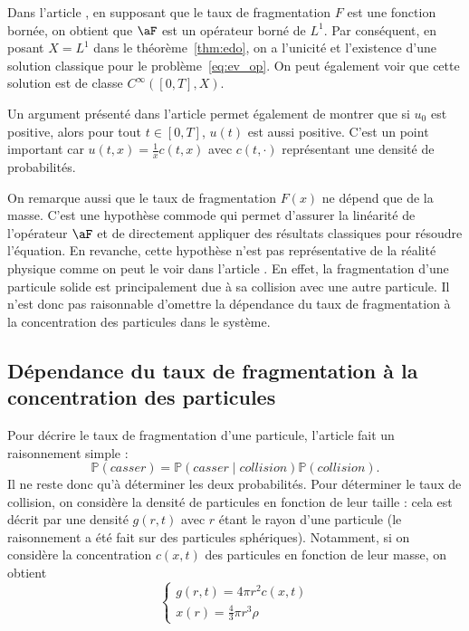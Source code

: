 \begin{rem}
	Dans l'article \cite{frag_deaconu}, en supposant que le taux de fragmentation $F$ est une fonction bornée, on obtient que $\aF$ est un opérateur borné de $L^1$. Par conséquent, en posant $X = L^1$ dans le théorème~\ref{thm:edo}, on a l'unicité et l'existence d'une solution classique pour le problème~\ref{eq:ev_op}. On peut également voir que cette solution est de classe $C^\infty([0,T], X)$.
\end{rem}

\begin{rem}
	Un argument présenté dans l'article \cite{frag_deaconu} permet également de montrer que si $u_0$ est positive, alors
	pour tout $t\in [0,T]$, $u(t)$ est aussi positive.
	C'est un point important car $u(t,x) = \frac{1}{x} c(t,x)$ avec $c(t, \cdot)$ représentant une densité de probabilités.
\end{rem}

\begin{rem}
	On remarque aussi que le taux de fragmentation $F(x)$ ne dépend que de la masse. C'est une hypothèse commode qui permet d'assurer la linéarité de l'opérateur
	$\aF$ et de directement appliquer des résultats classiques pour résoudre l'équation. En revanche, cette hypothèse n'est pas représentative de la réalité physique comme on peut le voir dans l'article \cite{geo}. En effet, la fragmentation d'une particule solide est principalement due à sa collision avec une autre particule. Il n'est donc pas raisonnable d'omettre la dépendance du taux de fragmentation à la concentration des particules dans le système.
\end{rem}

\subsection{Dépendance du taux de fragmentation à la concentration des particules}

Pour décrire le taux de fragmentation d'une particule, l'article \cite{geo} fait un raisonnement simple :
\[
	\mathbb{P}(casser) = \mathbb{P}(casser \mid collision) \mathbb{P}(collision).
\]
Il ne reste donc qu'à déterminer les deux probabilités. Pour déterminer le taux de collision, on considère la densité de particules en fonction de leur taille : cela est décrit par une densité $g(r,t)$ avec $r$ étant le rayon d'une particule (le raisonnement a été fait sur des particules sphériques). Notamment, si on considère la concentration $c(x,t)$ des particules en fonction de leur masse, on obtient
\begin{equation}
	\begin{cases}
		g(r,t) = 4\pi r^2 c(x,t) \\
		x(r) = \frac{4}{3}\pi r^3 \rho
	\end{cases}
	\label{eq:dens}
\end{equation}

